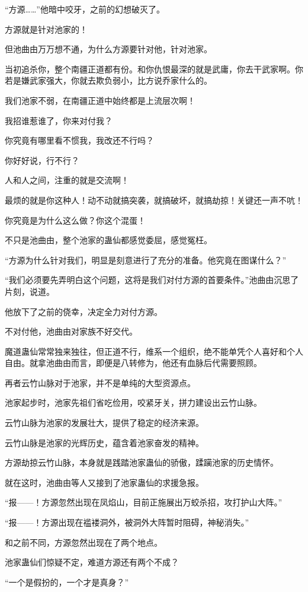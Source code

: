 \begin{this_body}
“方源……”他暗中咬牙，之前的幻想破灭了。

方源就是针对池家的！

但池曲由万万想不通，为什么方源要针对他，针对池家。

当初追杀你，整个南疆正道都有份。和你仇恨最深的就是武庸，你去干武家啊。你若是嫌武家强大，你就去欺负弱小，比方说乔家什么的。

我们池家不弱，在南疆正道中始终都是上流层次啊！

我招谁惹谁了，你来对付我？

你究竟有哪里看不惯我，我改还不行吗？

你好好说，行不行？

人和人之间，注重的就是交流啊！

最烦的就是你这种人！动不动就搞突袭，就搞破坏，就搞劫掠！关键还一声不吭！

你究竟是为什么这么做？你这个混蛋！

不只是池曲由，整个池家的蛊仙都感觉委屈，感觉冤枉。

“方源为什么针对我们，明显是刻意进行了充分的准备。他究竟在图谋什么？”

“我们必须要先弄明白这个问题，这将是我们对付方源的首要条件。”池曲由沉思了片刻，说道。

他放下了之前的侥幸，决定全力对付方源。

不对付他，池曲由对家族不好交代。

魔道蛊仙常常独来独往，但正道不行，维系一个组织，绝不能单凭个人喜好和个人自由。就拿池曲由而言，即便是八转修为，他还有血脉后代需要照顾。

再者云竹山脉对于池家，并不是单纯的大型资源点。

池家起步时，池家先祖们省吃俭用，咬紧牙关，拼力建设出云竹山脉。

云竹山脉为池家的发展壮大，提供了稳定的经济来源。

云竹山脉是池家的光辉历史，蕴含着池家奋发的精神。

方源劫掠云竹山脉，本身就是践踏池家蛊仙的骄傲，蹂躏池家的历史情怀。

就在这时，池曲由等人又接到了池家蛊仙的求援急报。

“报——！方源忽然出现在凤焰山，目前正施展出万蛟杀招，攻打护山大阵。”

“报——！方源出现在褴褛洞外，被洞外大阵暂时阻碍，神秘消失。”

和之前不同，方源忽然出现在了两个地点。

池家蛊仙们惊疑不定，难道方源还有两个不成？

“一个是假扮的，一个才是真身？”


\end{this_body}
